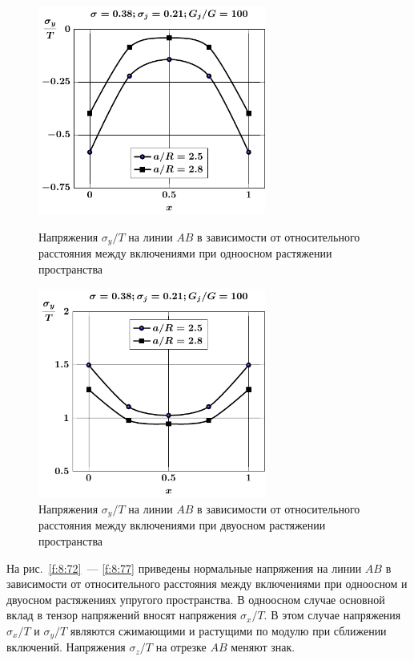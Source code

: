 \begin{figure}[h!]
\centering\footnotesize
\parbox[b]{7.5cm}{\centering\includegraphics[width=7.5cm]{inc13-a-d95-g100-t1-sig_y-ab.pdf}
\caption{Напряжения $\sigma_y/T$ на линии  $AB$ в зависимости от относительного расстояния между включениями при одноосном растяжении пространства
\label{f:8:74}}}\hfil\hfil
\parbox[b]{7.5cm}{\centering\includegraphics[width=7.5cm]{inc13-a-d95-g100-t2-sig_y-ab.pdf}
\caption{Напряжения $\sigma_y/T$ на линии  $AB$ в зависимости от относительного расстояния между включениями при двуосном растяжении пространства
\label{f:8:75}}}
\end{figure}

На рис.~\ref{f:8:72}~--- \ref{f:8:77} приведены нормальные напряжения на линии $AB$ в зависимости от относительного расстояния между включениями при одноосном и двуосном растяжениях упругого пространства. В одноосном случае основной вклад в тензор напряжений вносят напряжения $\sigma_x/T$. В этом случае напряжения $\sigma_x/T$ и $\sigma_y/T$ являются сжимающими и растущими по модулю при сближении включений. Напряжения $\sigma_z/T$ на отрезке $AB$ меняют знак.

